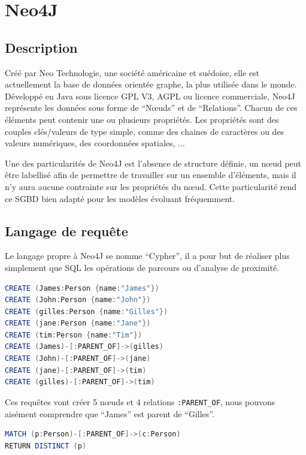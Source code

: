 \documentclass[a4paper,fleqn,12pt,oneside]{report}
\begin{document}
\section{Neo4J}

\subsection{Description}

Créé par Neo Technologie, une société américaine et suédoise, elle est actuellement la base de données orientée graphe, la plus utilisée dans le monde\cite{DBEnginesSite}. Développé en Java sous licence GPL V3, AGPL ou licence commerciale, Neo4J représente les données sous forme de \enquote{Nœuds} et de \enquote{Relations}. Chacun de ces éléments peut contenir une ou plusieurs propriétés. Les propriétés sont des couples clés/valeurs de type simple, comme des chaines de caractères ou des valeurs numériques, des coordonnées spatiales, ... \cite{Neo4JSite}

Une des particularités de Neo4J est l’absence de structure définie, un nœud peut être labellisé afin de permettre de travailler sur un ensemble d’éléments, mais il n’y aura aucune contrainte sur les propriétés du nœud. Cette particularité rend ce SGBD bien adapté pour les modèles évoluant fréquemment.


\subsection{Langage de requête}

Le langage propre à Neo4J se nomme \enquote{Cypher}\label{Cypher}, il a pour but de réaliser plus simplement que SQL les opérations de parcours ou d'analyse de proximité.

\begin{lstlisting}[language=java, frame=single]
CREATE (James:Person {name:"James"})
CREATE (John:Person {name:"John"})
CREATE (gilles:Person {name:"Gilles"})
CREATE (jane:Person {name:"Jane"})
CREATE (tim:Person {name:"Tim"})
CREATE (James)-[:PARENT_OF]->(gilles)
CREATE (John)-[:PARENT_OF]->(jane)
CREATE (jane)-[:PARENT_OF]->(tim)
CREATE (gilles)-[:PARENT_OF]->(tim)
\end{lstlisting}
\newpage

Ces requêtes vont créer 5 nœuds et 4 relations \texttt{:PARENT\_OF}, nous pouvons aisément comprendre que \enquote{James} est parent de \enquote{Gilles}.

\begin{lstlisting}[language=java, frame=single]
MATCH (p:Person)-[:PARENT_OF]->(c:Person) 
RETURN DISTINCT (p)
	
\end{lstlisting}
\end{document}
